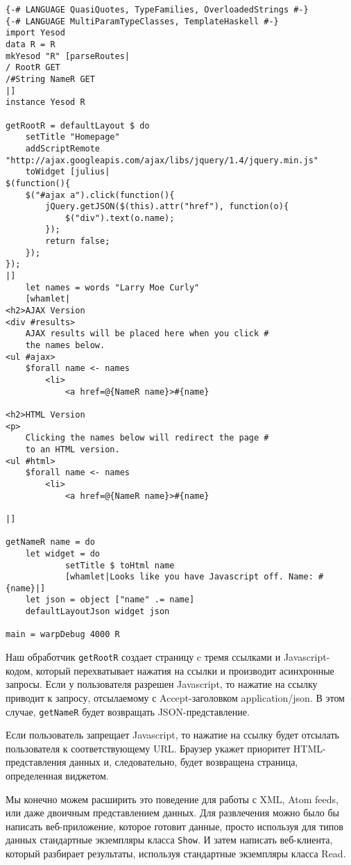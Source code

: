 \begin{lstlisting}
{-# LANGUAGE QuasiQuotes, TypeFamilies, OverloadedStrings #-}
{-# LANGUAGE MultiParamTypeClasses, TemplateHaskell #-}
import Yesod
data R = R
mkYesod "R" [parseRoutes|
/ RootR GET
/#String NameR GET
|]
instance Yesod R

getRootR = defaultLayout $ do
    setTitle "Homepage"
    addScriptRemote "http://ajax.googleapis.com/ajax/libs/jquery/1.4/jquery.min.js"
    toWidget [julius|
$(function(){
    $("#ajax a").click(function(){
        jQuery.getJSON($(this).attr("href"), function(o){
            $("div").text(o.name);
        });
        return false;
    });
});
|]
    let names = words "Larry Moe Curly"
    [whamlet|
<h2>AJAX Version
<div #results>
    AJAX results will be placed here when you click #
    the names below.
<ul #ajax>
    $forall name <- names
        <li>
            <a href=@{NameR name}>#{name}

<h2>HTML Version
<p>
    Clicking the names below will redirect the page #
    to an HTML version.
<ul #html>
    $forall name <- names
        <li>
            <a href=@{NameR name}>#{name}

|]

getNameR name = do
    let widget = do
            setTitle $ toHtml name
            [whamlet|Looks like you have Javascript off. Name: #{name}|]
    let json = object ["name" .= name]
    defaultLayoutJson widget json

main = warpDebug 4000 R

\end{lstlisting}

Наш обработчик \lstinline'getRootR' создает страницу c тремя ссылками и Javascript-кодом, который перехватывает нажатия на ссылки и производит асинхронные запросы. Если у пользователя разрешен Javascript, то нажатие на ссылку приводит к запросу, отсылаемому с Accept-заголовком application/json. В этом случае, \lstinline'getNameR' будет возвращать JSON-представление.

Если пользователь запрещает Javascript, то нажатие на ссылку будет отсылать пользователя к соответствующему URL. Браузер укажет приоритет HTML-представления данных и, следовательно, будет возвращена страница, определенная виджетом.

Мы конечно можем расширить это поведение для работы с XML, Atom feeds, или даже двоичным представлением данных. Для развлечения можно было бы написать веб-приложение, которое готовит данные, просто используя для типов данных стандартные экземпляры класса \lstinline'Show'. И затем написать веб-клиента, который разбирает результаты, используя стандартные экземпляры класса Read.

